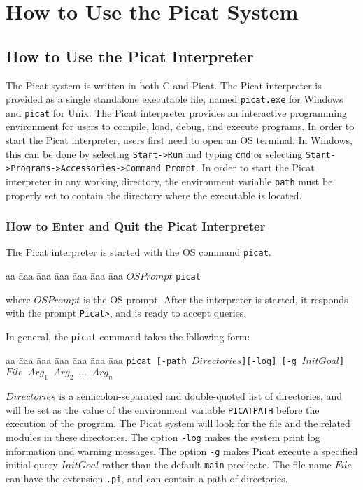 \chapter{How to Use the Picat System}
\section{How to Use the Picat Interpreter}
The Picat system is written in both C and Picat. The Picat interpreter is provided as a single standalone executable file, named \texttt{picat.exe} for Windows and \texttt{picat} for Unix. The Picat interpreter provides an interactive programming environment for users to compile, load, debug, and execute programs. In order to start the Picat interpreter, users first need to open an OS terminal. In Windows, this can be done by selecting \verb+Start->Run+ and typing \verb+cmd+ or selecting \verb+Start->Programs->Accessories->Command Prompt+.  In order to start the Picat interpreter in any working directory, the environment variable \texttt{path} must be properly set to contain the directory where the executable is located.

\subsection{How to Enter and Quit the Picat Interpreter}
The Picat interpreter is started with the OS command \texttt{picat}. 
\begin{tabbing}
aa \= aaa \= aaa \= aaa \= aaa \= aaa \= aaa \kill
\> \> $OSPrompt$ \texttt{picat}
\end{tabbing}
where $OSPrompt$ is the OS prompt. After the interpreter is started, it responds with the prompt \verb+Picat>+, and is ready to accept queries. 

In general, the \texttt{picat} command takes the following form:
\begin{tabbing}
aa \= aaa \= aaa \= aaa \= aaa \= aaa \= aaa \kill
\> \texttt{picat [-path $Directories$][-log] [-g $InitGoal$] $File$ $Arg_1$ $Arg_2$ $\ldots$ $Arg_n$}
\end{tabbing}
$Directories$ is a semicolon-separated and double-quoted list of directories, and will be set as the value of the environment variable \texttt{PICATPATH} before the execution of the program. The Picat system will look for the file and the related modules in these directories. The option \texttt{-log} makes the system print log information and warning messages. The option \texttt{-g} makes Picat execute a specified initial query $InitGoal$ rather than the default \texttt{main} predicate. The file name $File$ can have the extension \texttt{.pi}, and can contain a path of directories.


